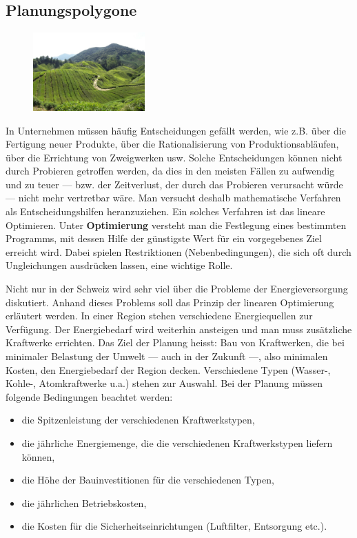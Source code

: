 \documentclass[%
11pt,%
twoside,%
titlepage,%
german,%
headsepline%
]{scrartcl}
\begin{document}
\subsection{Planungspolygone}

\begin{figure}
  \begin{center}
    \includegraphics[width=0.382\textwidth]{pictures/tee.JPG}
  \end{center}
\end{figure}
In Unternehmen m\"ussen h\"aufig Entscheidungen gef\"allt werden, wie z.B. \"uber die Fertigung neuer Produkte, \"uber die Rationalisierung von Produktionsabl\"aufen, \"uber die Errichtung von Zweigwerken usw. Solche Entscheidungen k\"onnen nicht durch Probieren getroffen werden, da dies in den meisten F\"allen zu aufwendig und zu teuer --- bzw. der Zeitverlust, der durch das Probieren verursacht w\"urde --- nicht mehr vertretbar w\"are. Man versucht deshalb mathematische Verfahren als Entscheidungshilfen heranzuziehen. Ein solches Verfahren ist das lineare Optimieren. Unter \textbf{Optimierung} versteht man die Festlegung eines bestimmten Programms, mit dessen Hilfe der g\"unstigste Wert f\"ur ein vorgegebenes Ziel erreicht wird. Dabei spielen Restriktionen (Nebenbedingungen), die sich oft durch Ungleichungen ausdr\"ucken lassen, eine wichtige Rolle.

Nicht nur in der Schweiz wird sehr viel \"uber die Probleme der Energieversorgung diskutiert. Anhand dieses Problems soll das Prinzip der linearen Optimierung erl\"autert werden. In einer Region stehen verschiedene Energiequellen zur Verf\"ugung. Der Energiebedarf wird weiterhin ansteigen und man muss zus\"atzliche Kraftwerke errichten. Das Ziel der Planung heisst: Bau von Kraftwerken, die bei minimaler Belastung der Umwelt --- auch in der Zukunft ---, also minimalen Kosten, den Energiebedarf der Region decken. Verschiedene Typen (Wasser-, Kohle-, Atomkraftwerke u.a.) stehen zur Auswahl. Bei der Planung m\"ussen folgende Bedingungen beachtet werden:

\begin{itemize}
\item die Spitzenleistung der verschiedenen Kraftwerkstypen,
\item die j\"ahrliche Energiemenge, die die verschiedenen Kraftwerkstypen liefern k\"onnen,
\item die H\"ohe der Bauinvestitionen f\"ur die verschiedenen Typen,
\item die j\"ahrlichen Betriebskosten,
\item die Kosten f\"ur die Sicherheitseinrichtungen (Luftfilter, Entsorgung etc.).
\end{itemize}
\end{document}
